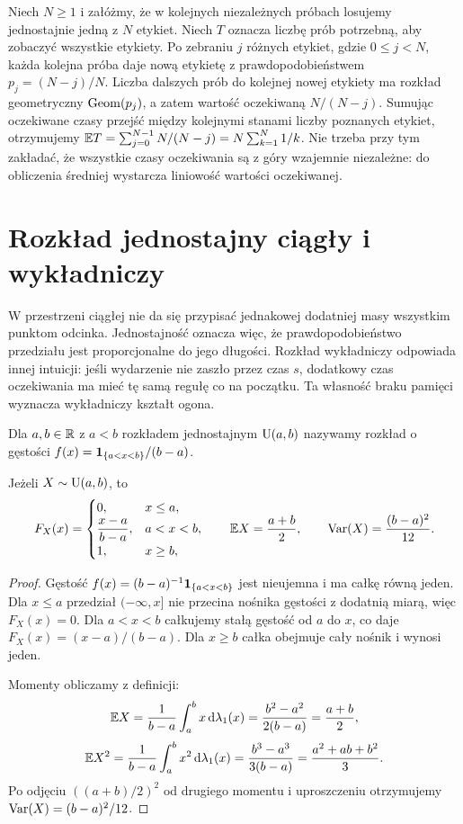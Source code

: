 \begin{przyklad}
Niech $N\geq1$ i załóżmy, że w kolejnych niezależnych próbach
losujemy jednostajnie jedną z $N$ etykiet. Niech $T$ oznacza
liczbę prób potrzebną, aby zobaczyć wszystkie etykiety.
Po zebraniu $j$ różnych etykiet, gdzie $0\leq j<N$,
każda kolejna próba daje nową etykietę z prawdopodobieństwem
$p_j=(N-j)/N$. Liczba dalszych prób do kolejnej nowej etykiety
ma rozkład geometryczny $\operatorname{Geom}(p_j)$, a zatem wartość
oczekiwaną $N/(N-j)$. Sumując oczekiwane czasy przejść
między kolejnymi stanami liczby poznanych etykiet,
otrzymujemy
$\mathbb{E} T=\sum_{j=0}^{N-1}N/(N-j)=N\sum_{k=1}^N1/k$.
Nie trzeba przy tym zakładać, że wszystkie czasy oczekiwania
są z góry wzajemnie niezależne: do obliczenia średniej
wystarcza liniowość wartości oczekiwanej.
\end{przyklad}

\section{Rozkład jednostajny ciągły i wykładniczy}
W przestrzeni ciągłej nie da się przypisać jednakowej dodatniej
masy wszystkim punktom odcinka. Jednostajność oznacza więc,
że prawdopodobieństwo przedziału jest proporcjonalne do jego
długości. Rozkład wykładniczy odpowiada innej intuicji:
jeśli wydarzenie nie zaszło przez czas $s$, dodatkowy czas
oczekiwania ma mieć tę samą regułę co na początku.
Ta własność braku pamięci wyznacza wykładniczy kształt ogona.

\begin{definicja}
Dla $a,b\in\mathbb{R}$ z $a<b$ rozkładem jednostajnym
$\operatorname{U}(a,b)$ nazywamy rozkład o gęstości
$f(x)=\mathbf{1}_{\{a<x<b\}}/(b-a)$.
\end{definicja}

\begin{stwierdzenie}
Jeżeli $X\sim\operatorname{U}(a,b)$, to
\[
F_X(x)=\begin{cases}
0,&x\leq a,\\
\dfrac{x-a}{b-a},&a<x<b,\\
1,&x\geq b,
\end{cases}
\qquad
\mathbb{E} X=\frac{a+b}{2},\qquad
\operatorname{Var}(X)=\frac{(b-a)^2}{12}.
\]
\end{stwierdzenie}
\begin{proof}
Gęstość $f(x)=(b-a)^{-1}\mathbf{1}_{\{a<x<b\}}$
jest nieujemna i ma całkę równą jeden.
Dla $x\leq a$ przedział $(-\infty,x]$ nie przecina
nośnika gęstości z dodatnią miarą, więc $F_X(x)=0$.
Dla $a<x<b$ całkujemy stałą gęstość od $a$ do $x$,
co daje $F_X(x)=(x-a)/(b-a)$.
Dla $x\geq b$ całka obejmuje cały nośnik i wynosi jeden.

Momenty obliczamy z definicji:
\[
\mathbb{E} X=\frac1{b-a}\int_a^b x\,\mathrm{d}\lambda_1(x)
=\frac{b^2-a^2}{2(b-a)}=\frac{a+b}2,
\]
\[
\mathbb{E} X^2=\frac1{b-a}\int_a^b x^2\,\mathrm{d}\lambda_1(x)
=\frac{b^3-a^3}{3(b-a)}=\frac{a^2+ab+b^2}3.
\]
Po odjęciu $((a+b)/2)^2$ od drugiego momentu
i uproszczeniu otrzymujemy
$\operatorname{Var}(X)=(b-a)^2/12$.
\end{proof}

